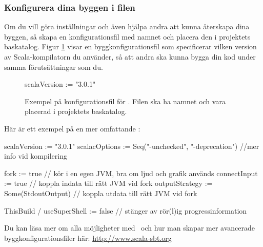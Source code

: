 \subsubsection{Konfigurera dina byggen i filen }

Om du vill göra inställningar och även hjälpa andra att kunna återskapa dina byggen, så skapa en konfigurationsfil med namnet  och placera den i projektets baskatalog. Figur \ref{fig:sbt:build-file} visar en byggkonfigurationsfil som specificerar vilken version av Scala-kompilatorn du använder, så att andra ska kunna bygga din kod under samma förutsättningar som du.

\begin{figure}[H]
\centering
\begin{Code}
scalaVersion := "3.0.1"
\end{Code}
\caption{Exempel på konfigurationsfil för \sbt. Filen ska ha namnet  och vara placerad i projektets baskatalog.}
\label{fig:sbt:build-file}
\end{figure}

\noindent Här är ett exempel på en mer omfattande :
\begin{CodeSmall}
scalaVersion   := "3.0.1"
scalacOptions  := Seq("-unchecked", "-deprecation") //mer info vid kompilering

fork           := true   // kör i en egen JVM, bra om ljud och grafik används 
connectInput   := true   // koppla indata till rätt JVM vid fork
outputStrategy := Some(StdoutOutput)  // koppla utdata till rätt JVM vid fork

ThisBuild / useSuperShell := false // stänger av rör(l)ig progressinformation
\end{CodeSmall}

\noindent Du kan läsa mer om alla möjligheter med \sbt\ och hur man skapar mer avancerade byggkonfigurationsfiler här: \url{http://www.scala-sbt.org}


